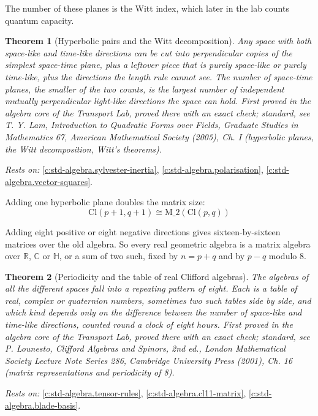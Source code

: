 \documentclass[11pt]{article}
\newtheorem{theorem}{Theorem}[section]
\theoremstyle{definition}
\theoremstyle{plain}
\providecommand{\C}{}\renewcommand{\C}{\mathbb{C}}
\providecommand{\Cl}{}\renewcommand{\Cl}{\mathrm{Cl}}
\providecommand{\HH}{}\renewcommand{\HH}{\mathbb{H}}
\providecommand{\Mat}{}\renewcommand{\Mat}{\mathrm{M}}
\providecommand{\R}{}\renewcommand{\R}{\mathbb{R}}
\begin{document}
The number of these planes is the Witt index, which later in the lab counts quantum capacity.

\begin{theorem}[Hyperbolic pairs and the Witt decomposition]\label{c:std-algebra.witt-decomposition}
Any space with both space-like and time-like directions can be cut into perpendicular copies of the simplest space-time plane, plus a leftover piece that is purely space-like or purely time-like, plus the directions the length rule cannot see. The number of space-time planes, the smaller of the two counts, is the largest number of independent mutually perpendicular light-like directions the space can hold.
\emph{First proved in} the algebra core of the Transport Lab, proved there with an exact check; standard, see T. Y. Lam, Introduction to Quadratic Forms over Fields, Graduate Studies in Mathematics 67, American Mathematical Society (2005), Ch. I (hyperbolic planes, the Witt decomposition, Witt's theorems).
\end{theorem}
\noindent\emph{Rests on:} \ref{c:std-algebra.sylvester-inertia}, \ref{c:std-algebra.polarisation}, \ref{c:std-algebra.vector-squares}.

Adding one hyperbolic plane doubles the matrix size: \[ \Cl(p{+}1, q{+}1) \cong \Mat\_2(\Cl(p,q)) \]

Adding eight positive or eight negative directions gives sixteen-by-sixteen matrices over the old algebra. So every real geometric algebra is a matrix algebra over $\R$, $\C$ or $\HH$, or a sum of two such, fixed by $n = p + q$ and by $p - q$ modulo $8$.

\begin{theorem}[Periodicity and the table of real Clifford algebras]\label{c:std-algebra.periodicity}
The algebras of all the different spaces fall into a repeating pattern of eight. Each is a table of real, complex or quaternion numbers, sometimes two such tables side by side, and which kind depends only on the difference between the number of space-like and time-like directions, counted round a clock of eight hours.
\emph{First proved in} the algebra core of the Transport Lab, proved there with an exact check; standard, see P. Lounesto, Clifford Algebras and Spinors, 2nd ed., London Mathematical Society Lecture Note Series 286, Cambridge University Press (2001), Ch. 16 (matrix representations and periodicity of 8).
\end{theorem}
\noindent\emph{Rests on:} \ref{c:std-algebra.tensor-rules}, \ref{c:std-algebra.cl11-matrix}, \ref{c:std-algebra.blade-basis}.
\end{document}
